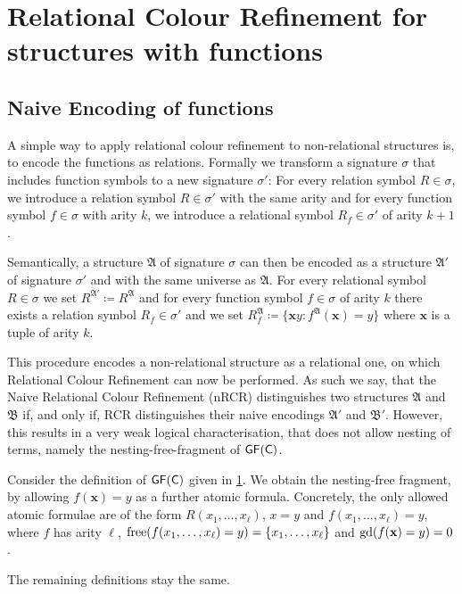 \section{Relational Colour Refinement for structures with functions}

\subsection{Naive Encoding of functions}
\label{Sec::NaiveEncodingOfFunctions}

A simple way to apply relational colour refinement to non-relational structures is, to encode the functions as relations.
Formally we transform a signature $\sigma$ that includes function symbols to a new signature $\sigma'$: 
For every relation symbol $R\in \sigma$, we introduce a relation symbol $R\in \sigma'$ with the same arity and for every function symbol $f\in\sigma$ with arity $k$, we introduce a relational symbol $R_f\in\sigma'$ of arity $k+1$.

Semantically, a structure $\mathfrak A$ of signature $\sigma$ can then be encoded as a structure $\mathfrak A'$ of signature $\sigma'$ and with the same universe as $\mathfrak A$. 
For every relational symbol $R\in\sigma$ we set $R^{\mathfrak A'}\coloneqq R^{\mathfrak A}$ and for every function symbol $f\in\sigma$ of arity $k$ there exists a relation symbol $R_f\in\sigma'$ and we set $R_f^{\mathfrak A}\coloneqq \{\mathbf xy : f^{\mathfrak A}(\mathbf x)=y\}$ where $\mathbf x$ is a tuple of arity $k$.

This procedure encodes a non-relational structure as a relational one, on which Relational Colour Refinement can now be performed.
As such we say, that the Naive Relational Colour Refinement (nRCR) distinguishes two structures $\mathfrak A$ and $\mathfrak B$ if, and only if, RCR distinguishes their naive encodings $\mathfrak A'$ and $\mathfrak B'$.
However, this results in a very weak logical characterisation, that does not allow nesting of terms, namely the nesting-free-fragment of $\mathsf{GF}(\mathsf{C})$.

\begin{definition}
	Consider the definition of $\mathsf{GF}(\mathsf{C})$ given in \ref{}.
	We obtain the nesting-free fragment, by allowing $f(\mathbf x)=y$ as a further atomic formula.
	Concretely, the only allowed atomic formulae are of the form $R(x_1,\dots,x_\ell)$, $x=y$ and $f(x_1,\dots,x_\ell)=y$, where $f$ has arity $\ell$, $\operatorname{free}(f(x_1,\dots,x_\ell)=y)=\{x_1,\dots,x_\ell\}$ and $\operatorname{gd}(f(\mathbf x)=y)=0$.
	
	The remaining definitions stay the same.
\end{definition}

